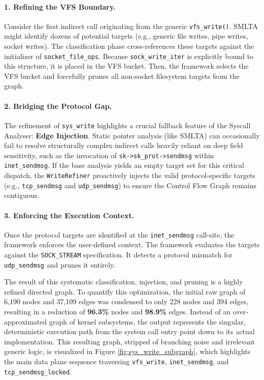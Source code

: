 \paragraph{1. Refining the VFS Boundary.}
Consider the first indirect call originating from the generic \texttt{vfs\_write()}.
SMLTA might identify dozens of potential targets (e.g., generic file writes, pipe writes, socket writes).
The classification phase cross-references these targets against the initializer of \texttt{socket\_file\_ops}.
Because \texttt{sock\_write\_iter} is explicitly bound to this structure, it is placed in the VFS bucket.
Then, the framework selects the VFS bucket and forcefully prunes all non-socket filesystem targets from the graph.

\paragraph{2. Bridging the Protocol Gap.}
The refinement of \texttt{sys\_write} highlights a crucial fallback feature of the Syscall Analyser: \textbf{Edge Injection}.
Static pointer analysis (like SMLTA) can occasionally fail to resolve structurally complex indirect calls heavily reliant on deep field sensitivity, such as the invocation of \texttt{sk->sk\_prot->sendmsg} within \texttt{inet\_sendmsg}.
If the base analysis yields an empty target set for this critical dispatch, the \texttt{WriteRefiner} proactively injects the valid protocol-specific targets (e.g., \texttt{tcp\_sendmsg} and \texttt{udp\_sendmsg}) to ensure the Control Flow Graph remains contiguous.

\paragraph{3. Enforcing the Execution Context.}
Once the protocol targets are identified at the \texttt{inet\_sendmsg} call-site, the framework enforces the user-defined context.
The framework evaluates the targets against the \texttt{SOCK\_STREAM} specification.
It detects a protocol mismatch for \texttt{udp\_sendmsg} and prunes it entirely. 

The result of this systematic classification, injection, and pruning is a highly refined directed graph.
To quantify this optimization, the initial raw graph of 6,190 nodes and 37,109 edges was condensed to only 228 nodes and 394 edges, resulting in a reduction of \textbf{96.3\%} nodes and \textbf{98.9\%} edges.
Instead of an over-approximated graph of kernel subsystems, the output represents the singular, deterministic execution path from the system call entry point down to its actual implementation.
This resulting graph, stripped of branching noise and irrelevant generic logic, is visualized in Figure \ref{fig:sys_write_subgraph}, which highlights the main data plane sequence traversing \texttt{vfs\_write}, \texttt{inet\_sendmsg}, and \texttt{tcp\_sendmsg\_locked}.

